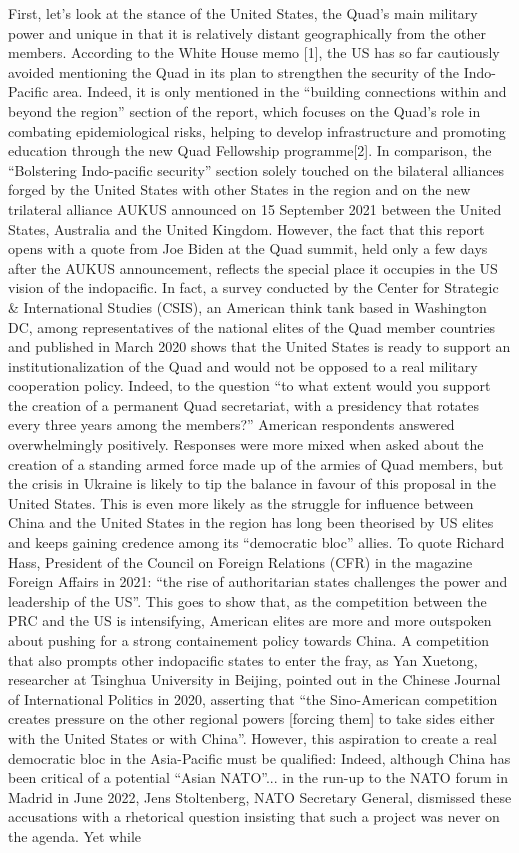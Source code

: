 \documentclass[11pt,a4paper]{article}
\begin{document}
First, let’s look at the stance of the United States, the Quad’s main military power and unique in that it is relatively distant geographically from the other members. According to the White House memo {[}1{]}, the US has so far cautiously avoided mentioning the Quad in its plan to strengthen the security of the Indo-Pacific area. Indeed, it is only mentioned in the “building connections within and beyond the region” section of the report, which focuses on the Quad’s role in combating epidemiological risks, helping to develop infrastructure and promoting education through the new Quad Fellowship programme{[}2{]}. In comparison, the “Bolstering Indo-pacific security” section solely touched on the bilateral alliances forged by the United States with other States in the region and on the new trilateral alliance AUKUS announced on 15 September 2021 between the United States, Australia and the United Kingdom. However, the fact that this report opens with a quote from Joe Biden at the Quad summit, held only a few days after the AUKUS announcement, reflects the special place it occupies in the US vision of the indopacific. In fact, a survey conducted by the Center for Strategic \& International Studies (CSIS), an American think tank based in Washington DC, among representatives of the national elites of the Quad member countries and published in March 2020 shows that the United States is ready to support an institutionalization of the Quad and would not be opposed to a real military cooperation policy. Indeed, to the question “to what extent would you support the creation of a permanent Quad secretariat, with a presidency that rotates every three years among the members?” American respondents answered overwhelmingly positively. Responses were more mixed when asked about the creation of a standing armed force made up of the armies of Quad members, but the crisis in Ukraine is likely to tip the balance in favour of this proposal in the United States. This is even more likely as the struggle for influence between China and the United States in the region has long been theorised by US elites and keeps gaining credence among its “democratic bloc” allies. To quote Richard Hass, President of the Council on Foreign Relations (CFR) in the magazine Foreign Affairs in 2021: “the rise of authoritarian states challenges the power and leadership of the US”. This goes to show that, as the competition between the PRC and the US is intensifying, American elites are more and more outspoken about pushing for a strong containement policy towards China. A competition that also prompts other indopacific states to enter the fray, as Yan Xuetong, researcher at Tsinghua University in Beijing, pointed out in the Chinese Journal of International Politics in 2020, asserting that “the Sino-American competition creates pressure on the other regional powers [forcing them] to take sides either with the United States or with China”. However, this aspiration to create a real democratic bloc in the Asia-Pacific must be qualified: Indeed, although China has been critical of a potential “Asian NATO”... in the run-up to the NATO forum in Madrid in June 2022, Jens Stoltenberg, NATO Secretary General, dismissed these accusations with a rhetorical question insisting that such a project was never on the agenda. Yet while 
\end{document}
